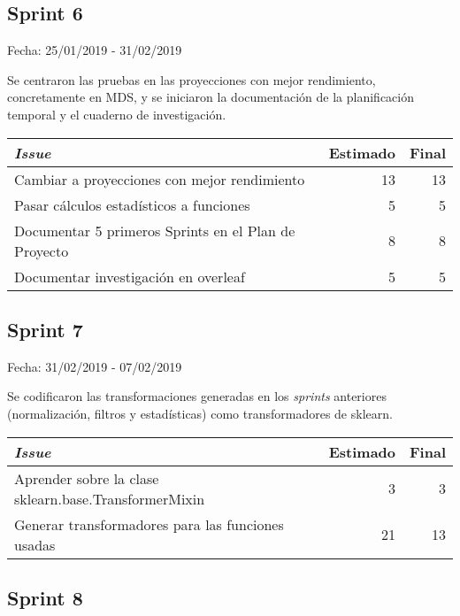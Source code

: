 \subsection{Sprint 6}

Fecha: 25/01/2019 - 31/02/2019

Se centraron las pruebas en las proyecciones con mejor rendimiento, concretamente en MDS, y se iniciaron la documentación de la planificación temporal y el cuaderno de investigación. 

\begin{table}[h]
	\begin{tabularx}{\textwidth}{|Xrr|}
		\hline \textbf{\textit{Issue}} & \textbf{Estimado} & \textbf{Final}\\
		\hline Cambiar a proyecciones con mejor rendimiento & 13 & 13 \\
		\hline Pasar cálculos estadísticos a funciones & 5 & 5 \\
		\hline Documentar 5 primeros Sprints en el Plan de Proyecto & 8 & 8 \\
		\hline Documentar investigación en overleaf & 5 & 5 \\
		\hline
	\end{tabularx}
\end{table}

\subsection{Sprint 7}

Fecha: 31/02/2019 - 07/02/2019

Se codificaron las transformaciones generadas en los \textit{sprints} anteriores (normalización, filtros y estadísticas) como transformadores de sklearn.

\begin{table}[h]
	\begin{tabularx}{\textwidth}{|Xrr|}
		\hline \textbf{\textit{Issue}} & \textbf{Estimado} & \textbf{Final}\\
		\hline Aprender sobre la clase sklearn.base.TransformerMixin & 3 & 3 \\
		\hline Generar transformadores para las funciones usadas & 21 & 13 \\
		\hline
	\end{tabularx}
\end{table}

\subsection{Sprint 8}

